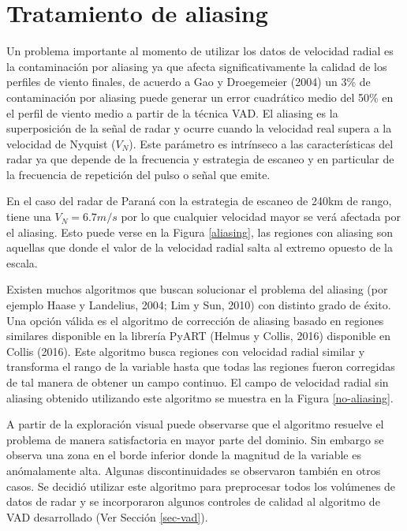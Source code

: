 \documentclass[12pt,spanish,oneside]{book}
\begin{document}
\section{Tratamiento de aliasing}\label{tratamiento-de-aliasing}

Un problema importante al momento de utilizar los datos de velocidad
radial es la contaminación por aliasing ya que afecta significativamente
la calidad de los perfiles de viento finales, de acuerdo a Gao y
Droegemeier (2004) un 3\% de contaminación por aliasing puede generar un
error cuadrático medio del 50\% en el perfil de viento medio a partir de
la técnica VAD. El aliasing es la superposición de la señal de radar y
ocurre cuando la velocidad real supera a la velocidad de Nyquist
(\(V_N\)). Este parámetro es intrínseco a las características del radar
ya que depende de la frecuencia y estrategia de escaneo y en particular
de la frecuencia de repetición del pulso o señal que emite.

En el caso del radar de Paraná con la estrategia de escaneo de 240km de
rango, tiene una \(V_N = 6.7 m/s\) por lo que cualquier velocidad mayor
se verá afectada por el aliasing. Esto puede verse en la Figura
\ref{aliasing}, las regiones con aliasing son aquellas que donde el
valor de la velocidad radial salta al extremo opuesto de la escala.

Existen muchos algoritmos que buscan solucionar el problema del aliasing
(por ejemplo Haase y Landelius, 2004; Lim y Sun, 2010) con distinto
grado de éxito. Una opción válida es el algoritmo de corrección de
aliasing basado en regiones similares disponible en la librería PyART
(Helmus y Collis, 2016) disponible en Collis (2016). Este algoritmo
busca regiones con velocidad radial similar y transforma el rango de la
variable hasta que todas las regiones fueron corregidas de tal manera de
obtener un campo continuo. El campo de velocidad radial sin aliasing
obtenido utilizando este algoritmo se muestra en la Figura
\ref{no-aliasing}.

A partir de la exploración visual puede observarse que el algoritmo
resuelve el problema de manera satisfactoria en mayor parte del dominio.
Sin embargo se observa una zona en el borde inferior donde la magnitud
de la variable es anómalamente alta. Algunas discontinuidades se
observaron también en otros casos. Se decidió utilizar este algoritmo
para preprocesar todos los volúmenes de datos de radar y se incorporaron
algunos controles de calidad al algoritmo de VAD desarrollado (Ver
Sección \ref{sec-vad}).
\end{document}
